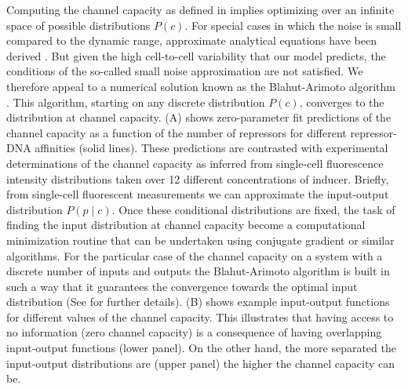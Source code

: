 Computing the channel capacity as defined in  implies
optimizing over an infinite space of possible distributions $P(c)$. For special
cases in which the noise is small compared to the dynamic range, approximate
analytical equations have been derived \cite{Tkacik2008a}. But given the high
cell-to-cell variability that our model predicts, the conditions of the
so-called small noise approximation are not satisfied. We therefore appeal to a
numerical solution known as the Blahut-Arimoto algorithm \cite{Blahut1972}.
This algorithm, starting on any discrete distribution $P(c)$, converges to
the distribution at channel capacity. (A) shows
zero-parameter fit predictions of the channel capacity as a function of the
number of repressors for different repressor-DNA affinities (solid lines).
These predictions are contrasted with experimental determinations of the
channel capacity as inferred from single-cell fluorescence intensity
distributions taken over 12 different concentrations of inducer. Briefly, from
single-cell fluorescent measurements we can approximate the input-output
distribution $P(p \mid c)$. Once these conditional distributions are fixed, the
task of finding the input distribution at channel capacity become a
computational minimization routine that can be undertaken using conjugate
gradient or similar algorithms. For the particular case of the channel capacity
on a system with a discrete number of inputs and outputs the Blahut-Arimoto
algorithm is built in such a way that it guarantees the convergence towards the
optimal input distribution (See  for further details).
(B) shows example input-output functions for different
values of the channel capacity. This illustrates that having access to no
information (zero channel capacity) is a consequence of having overlapping
input-output functions (lower panel). On the other hand, the more separated the
input-output distributions are (upper panel) the higher the channel capacity
can be.

